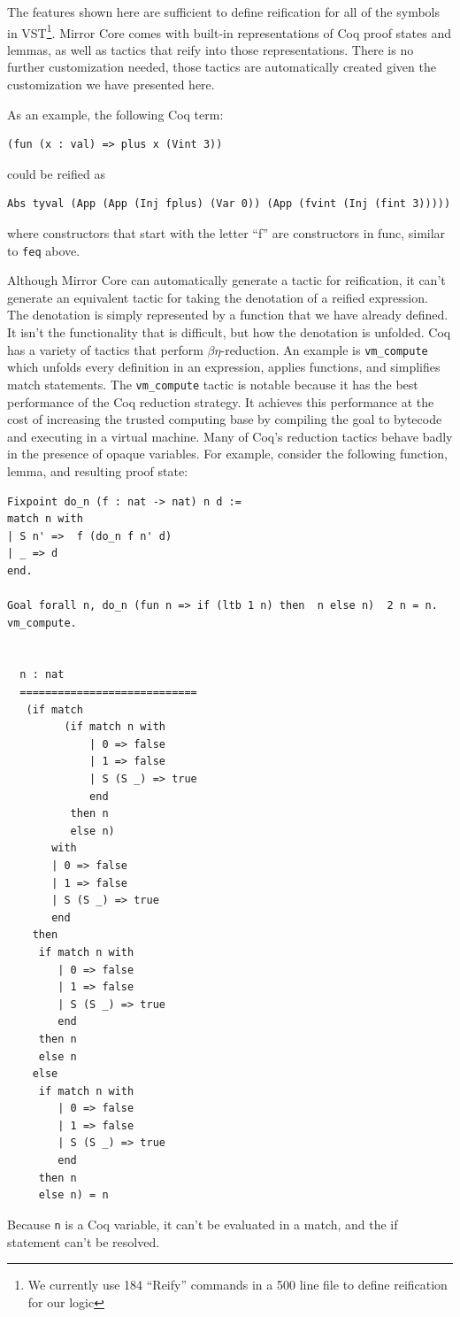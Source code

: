 \documentclass{puthesis}
\begin{document}
The features shown here are sufficient to define reification for all
of the symbols in VST\footnote{We currently use 184 ``Reify'' commands
  in a 500 line file to define reification for our logic}. Mirror Core
comes with built-in representations of Coq proof states and lemmas, as
well as tactics that reify into those representations. There is no
further customization needed, those tactics are automatically created
given the customization we have presented here.

As an example, the following Coq term:

\begin{lstlisting}
(fun (x : val) => plus x (Vint 3))
\end{lstlisting}

could be reified as

\begin{lstlisting}
Abs tyval (App (App (Inj fplus) (Var 0)) (App (fvint (Inj (fint 3)))))
\end{lstlisting}
where constructors that start with the letter ``f'' are constructors
in func, similar to \lstinline|feq| above.

Although Mirror Core can automatically generate a tactic for
reification, it can't generate an equivalent tactic for taking the
denotation of a reified expression. The denotation is simply
represented by a function that we have already defined. It isn't the
functionality that is difficult, but how the denotation is
unfolded. Coq has a variety of tactics that perform
$\beta\eta$-reduction. An example is \lstinline|vm_compute| which unfolds
every definition in an expression, applies functions, and simplifies
match statements. The \lstinline|vm_compute| tactic is notable because
it has the best performance of the Coq reduction strategy. It achieves
this performance at the cost of increasing the trusted computing base
by compiling the goal to bytecode and executing in a virtual machine. 
Many of Coq's reduction tactics behave badly in the presence of opaque
variables. For example, consider the following function, lemma, and
resulting proof state:
\pagebreak
\begin{singlespace}
\begin{lstlisting}
Fixpoint do_n (f : nat -> nat) n d :=
match n with
| S n' =>  f (do_n f n' d)
| _ => d
end.

Goal forall n, do_n (fun n => if (ltb 1 n) then  n else n)  2 n = n.
vm_compute.


  n : nat
  ============================
   (if match
         (if match n with
             | 0 => false
             | 1 => false
             | S (S _) => true
             end
          then n
          else n)
       with
       | 0 => false
       | 1 => false
       | S (S _) => true
       end
    then
     if match n with
        | 0 => false
        | 1 => false
        | S (S _) => true
        end
     then n
     else n
    else
     if match n with
        | 0 => false
        | 1 => false
        | S (S _) => true
        end
     then n
     else n) = n
\end{lstlisting}
\end{singlespace}
Because \lstinline|n| is a Coq variable, it can't be evaluated in a
match, and the if statement can't be resolved.
\end{document}
